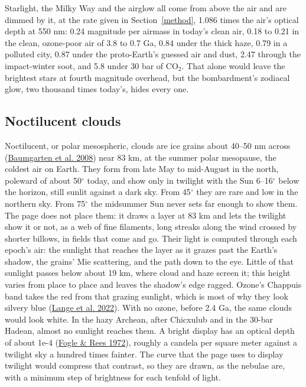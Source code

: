 \documentclass[9pt,twocolumn]{extarticle}
\begin{document}
Starlight, the Milky Way and the airglow all come from above the air and are dimmed by it, at the rate given in Section~\ref{method}, 1.086 times the air's optical depth at 550 nm: 0.24 magnitude per airmass in today's clean air, 0.18 to 0.21 in the clean, ozone-poor air of 3.8 to 0.7 Ga, 0.84 under the thick haze, 0.79 in a polluted city, 0.87 under the proto-Earth's guessed air and dust, 2.47 through the impact-winter soot, and 5.8 under 30 bar of CO$_2$. That alone would leave the brightest stars at fourth magnitude overhead, but the bombardment's zodiacal glow, two thousand times today's, hides every one.


\subsection{Noctilucent clouds}\label{noctilucent-clouds}

Noctilucent, or polar mesospheric, clouds are ice grains about 40--50 nm across (\protect\hyperlink{cite.baumgarten2008}{Baumgarten et al. 2008}) near 83 km, at the summer polar mesopause, the coldest air on Earth. They form from late May to mid-August in the north, poleward of about 50$^\circ$ today, and show only in twilight with the Sun 6--16$^\circ$ below the horizon, still sunlit against a dark sky. From 45$^\circ$ they are rare and low in the northern sky. From 75$^\circ$ the midsummer Sun never sets far enough to show them. The page does not place them: it draws a layer at 83 km and lets the twilight show it or not, as a web of fine filaments, long streaks along the wind crossed by shorter billows, in fields that come and go. Their light is computed through each epoch's air: the sunlight that reaches the layer as it grazes past the Earth's shadow, the grains' Mie scattering, and the path down to the eye. Little of that sunlight passes below about 19 km, where cloud and haze screen it; this height varies from place to place and leaves the shadow's edge ragged. Ozone's Chappuis band takes the red from that grazing sunlight, which is most of why they look silvery blue (\protect\hyperlink{cite.lange2022}{Lange et al. 2022}). With no ozone, before 2.4 Ga, the same clouds would look white. In the hazy Archean, after Chicxulub and in the 30-bar Hadean, almost no sunlight reaches them. A bright display has an optical depth of about 1e-4 (\protect\hyperlink{cite.fogle1972}{Fogle \& Rees 1972}), roughly a candela per square meter against a twilight sky a hundred times fainter. The curve that the page uses to display twilight would compress that contrast, so they are drawn, as the nebulae are, with a minimum step of brightness for each tenfold of light.
\end{document}
